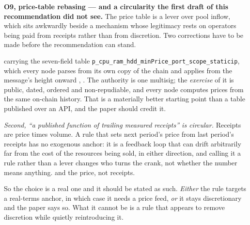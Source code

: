 \textbf{O9, price-table rebasing --- and a circularity the first draft of this recommendation did not
see.} The price table is a lever over pool inflow, which sits awkwardly beside a mechanism whose
legitimacy rests on operators being paid from receipts rather than from discretion. Two corrections
have to be made before the recommendation can stand.

carrying the seven-field table \texttt{p\_cpu\_ram\_hdd\_minPrice\_port\_scope\_staticip}, which every
node parses from its own copy of the chain and applies from the message's height onward \shipped
{},
.
The authority is one multisig; the \emph{exercise} of it is public, dated, ordered and
non-repudiable, and every node computes prices from the same on-chain history. That is a materially
better starting point than a table published over an API, and the paper should credit it.

\emph{Second, ``a published function of trailing measured receipts'' is circular.} Receipts are price
times volume. A rule that sets next period's price from last period's receipts has no exogenous
anchor: it is a feedback loop that can drift arbitrarily far from the cost of the resources being
sold, in either direction, and calling it a rule rather than a lever changes who turns the crank, not
whether the number means anything.  and the \flux{} price,
not receipts.

So the choice is a real one and it should be stated as such. \emph{Either} the rule targets a
real-terms anchor, in which case it needs a price feed, \emph{or} it stays discretionary and the paper
says so. What it cannot be is a rule that appears to remove discretion while quietly reintroducing it.

